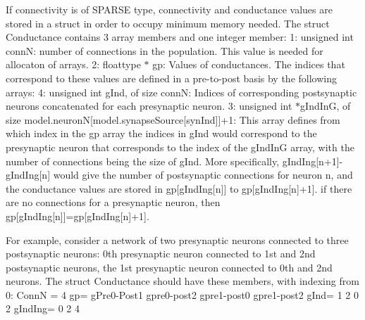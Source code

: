 If connectivity is of S\+P\+A\+R\+S\+E type, connectivity and conductance values are stored in a struct in order to occupy minimum memory needed. The struct Conductance contains 3 array members and one integer member\+: 1\+: unsigned int conn\+N\+: number of connections in the population. This value is needed for allocaton of arrays. 2\+: floattype $\ast$ gp\+: Values of conductances. The indices that correspond to these values are defined in a pre-\/to-\/post basis by the following arrays\+: 4\+: unsigned int g\+Ind, of size conn\+N\+: Indices of corresponding postsynaptic neurons concatenated for each presynaptic neuron. 3\+: unsigned int $\ast$g\+Ind\+In\+G, of size model.\+neuron\+N\mbox{[}model.\+synapse\+Source\mbox{[}syn\+Ind\mbox{]}\mbox{]}+1\+: This array defines from which index in the gp array the indices in g\+Ind would correspond to the presynaptic neuron that corresponds to the index of the g\+Ind\+In\+G array, with the number of connections being the size of g\+Ind. More specifically, g\+Ind\+Ing\mbox{[}n+1\mbox{]}-\/g\+Ind\+Ing\mbox{[}n\mbox{]} would give the number of postsynaptic connections for neuron n, and the conductance values are stored in gp\mbox{[}g\+Ind\+Ing\mbox{[}n\mbox{]}\mbox{]} to gp\mbox{[}g\+Ind\+Ing\mbox{[}n\mbox{]}+1\mbox{]}. if there are no connections for a presynaptic neuron, then gp\mbox{[}g\+Ind\+Ing\mbox{[}n\mbox{]}\mbox{]}=gp\mbox{[}g\+Ind\+Ing\mbox{[}n\mbox{]}+1\mbox{]}.

For example, consider a network of two presynaptic neurons connected to three postsynaptic neurons\+: 0th presynaptic neuron connected to 1st and 2nd postsynaptic neurons, the 1st presynaptic neuron connected to 0th and 2nd neurons. The struct Conductance should have these members, with indexing from 0\+: Conn\+N = 4 gp= g\+Pre0-\/\+Post1 gpre0-\/post2 gpre1-\/post0 gpre1-\/post2 g\+Ind= 1 2 0 2 g\+Ind\+Ing= 0 2 4

